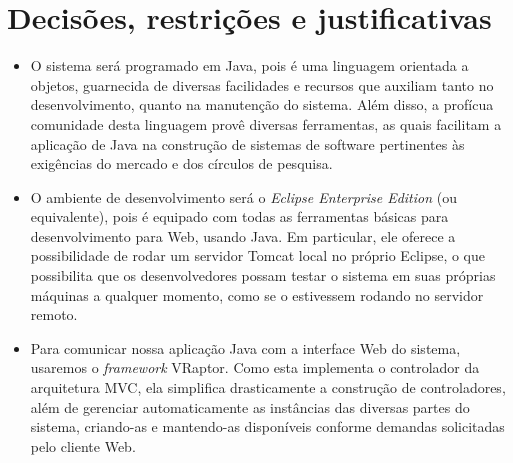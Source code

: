 \documentclass[11pt, a4paper]{article}
\begin{document}
    \section{Decisões, restrições e justificativas}
        \begin{itemize}
            \item O sistema será programado em Java, pois é uma linguagem
            orientada a objetos, guarnecida de diversas facilidades e recursos que
            auxiliam tanto no desenvolvimento, quanto na manutenção do sistema.
            Além disso, a profícua comunidade desta linguagem provê diversas ferramentas, as quais 
            facilitam a aplicação de Java na construção de sistemas de software
            pertinentes às exigências do mercado e dos círculos de pesquisa.
            
            \item O ambiente de desenvolvimento será o \emph{Eclipse Enterprise
            Edition} (ou equivalente), pois é equipado com todas as ferramentas
            básicas para desenvolvimento para Web, usando Java. Em particular, ele
            oferece a possibilidade de rodar um servidor Tomcat local no próprio
            Eclipse, o que possibilita que os desenvolvedores possam testar o
            sistema em suas próprias máquinas a qualquer momento, como se o
            estivessem rodando no servidor remoto.

            \item Para comunicar nossa aplicação Java com a interface Web do
            sistema, usaremos o \emph{framework} VRaptor. Como esta implementa o controlador da arquitetura 
MVC, ela simplifica drasticamente  a construção de controladores, além de gerenciar automaticamente as
            instâncias das diversas partes do sistema, criando-as e mantendo-as
            disponíveis conforme demandas solicitadas pelo cliente Web.


\end{itemize}
\end{document}
